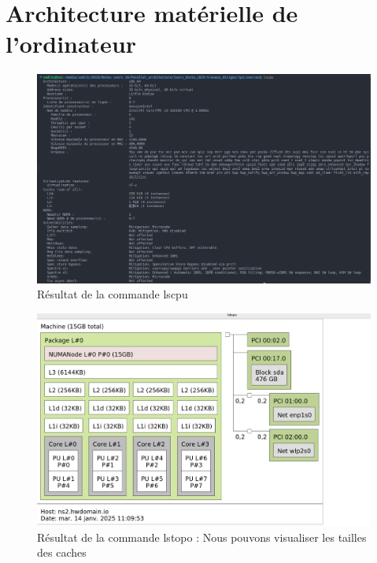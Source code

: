 \documentclass[a4paper,13pt]{book}
\author{\bsc{DADA SIMEU Cédric Darel}}
\begin{document}
	
\tableofcontents
\listoffigures
\newpage
\section{Architecture matérielle de l'ordinateur}
\begin{figure}[!h]
  \begin{center}
  \includegraphics[scale=0.5]{../images/lscpu.png}
  \caption{Résultat de la commande lscpu}
  \label{fig:lscpu}
\end{center}
\end{figure}


\begin{figure}[!h]
  \begin{center}
      \includegraphics[scale=0.3]{../images/lstopo.png}
      \caption{Résultat de la commande lstopo : Nous pouvons visualiser les tailles des caches}
      \label{tab:ls_topo}
  \end{center}
\end{figure}
\clearpage
\end{document}
